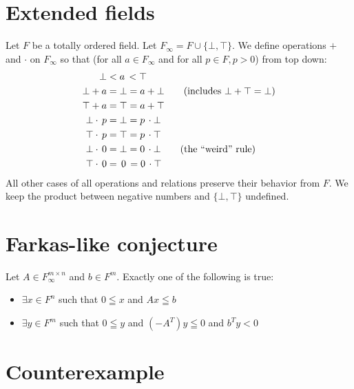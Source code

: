 \documentclass[]{article}
\begin{document}
\section {Extended fields}

Let $F$ be a totally ordered field.
Let $F_\infty = F \cup \{ \bot, \top \}$.
We define operations $+$ and $\cdot$ on $F_\infty$
so that
(for all $a \in F_\infty$ and for all $p \in F, p > 0$)
from top down:
\begin{align*}
	\bot <& \;a\, < \top \\
	\bot + a =& \;\bot = a + \bot \text{\qquad(includes $\bot + \top = \bot$)} \\
	\top + a =& \;\top = a + \top \\
	\bot \cdot\, p =& \;\bot = p \,\cdot \bot \\
	\top \cdot\, p =& \;\top = p \,\cdot \top \\
	\bot \cdot\, 0 =& \;\bot = 0 \,\cdot \bot \text{\qquad(the ``weird'' rule)} \\
	\top \cdot\, 0 =& \;\,0\, = 0 \,\cdot \top
\end{align*}
All other cases of all operations and relations
preserve their behavior from $F$.
We keep the product between negative numbers and
$\{ \bot, \top \}$ undefined.

%

\section{Farkas-like conjecture}

Let $A \in F_\infty^{m \times n}$ and $b \in F^m$.
Exactly one of the following is true:
\begin{itemize}
	\item $\exists x \in F^n$ such that
	$0 \leqq x$ and $A x \leqq b$
	\item $\exists y \in F^m$ such that
	$0 \leqq y$ and $(-A^T) y \leqq 0$ and $b^T y < 0$
\end{itemize}

\section{Counterexample}
\end{document}
